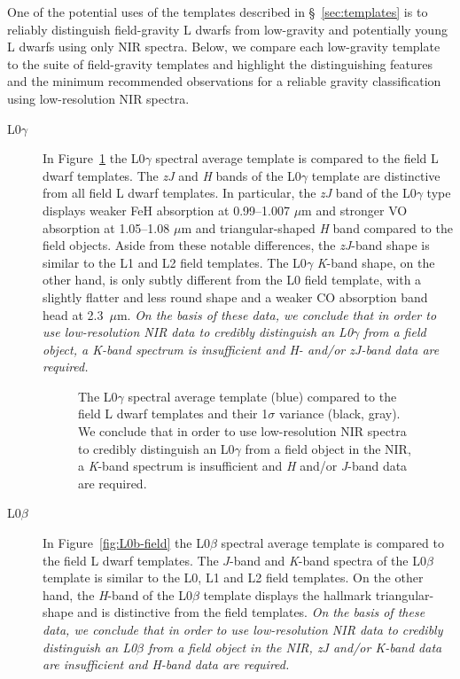 \documentclass[modern]{aastex61}
\begin{document}
One of the potential uses of the templates described in \S~\ref{sec:templates} is to reliably distinguish field-gravity L dwarfs from low-gravity and potentially young L dwarfs using only NIR spectra.
Below, we compare each low-gravity template to the suite of field-gravity templates and highlight the distinguishing features and the minimum recommended observations for a reliable gravity classification using low-resolution NIR spectra.

\begin{description}
\item[L0$\gamma$]{
In Figure~\ref{fig:L0lg-field}\added{,} the L0$\gamma$ spectral average template is compared to the field L dwarf templates.
The \emph{zJ} and \emph{H} bands of the L0$\gamma$ template are distinctive from all field L dwarf templates.
In particular, the \emph{zJ} band of the L0$\gamma$ type displays weaker FeH absorption at 0.99--1.007 $\mu$m and stronger VO absorption at 1.05--1.08 $\mu$m and triangular-shaped \emph{H} band compared to the field objects.
Aside from these notable differences, the \emph{zJ}-band shape is similar to the L1 and L2 field templates.
The L0$\gamma$ \emph{K}-band shape, on the other hand, is only subtly different from the L0 field template, with a slightly flatter and less round shape and a weaker CO absorption band head at 2.3~$\mu$m.
\emph{On the basis of these data, we conclude that in order to use low-resolution NIR data to credibly distinguish an L0$\gamma$ from a field object, a \emph{K}-band spectrum is insufficient and \emph{H}- and/or \emph{zJ}-band data are required.}
}

\begin{figure}[b]
    \caption{The L0$\gamma$ spectral average template (blue) compared to the field L dwarf templates and their 1$\sigma$ variance (black, gray). We conclude that in order to use low-resolution NIR spectra to credibly distinguish an L0$\gamma$ from a field object in the NIR, a \emph{K}-band spectrum is insufficient and \emph{H} and/or \emph{J}-band data are required.}
    \label{fig:L0lg-field}
\end{figure}
\clearpage

\item[L0$\beta$]{
In Figure~\ref{fig:L0b-field}\added{,} the L0$\beta$ spectral average template is compared to the field L dwarf templates.
The $J$-band and \emph{K}-band spectra of the L0$\beta$ template is similar to the L0, L1 and L2 field templates.
On the other hand, the \emph{H}-band of the L0$\beta$ template displays the hallmark triangular-shape and is distinctive from the field templates.
\emph{On the basis of these data, we conclude that in order to use low-resolution NIR data to credibly distinguish an L0$\beta$ from a field object in the NIR, \emph{zJ} and/or \emph{K}-band data are insufficient and \emph{H}-band data are required.}
}


\end{description}
\end{document}
